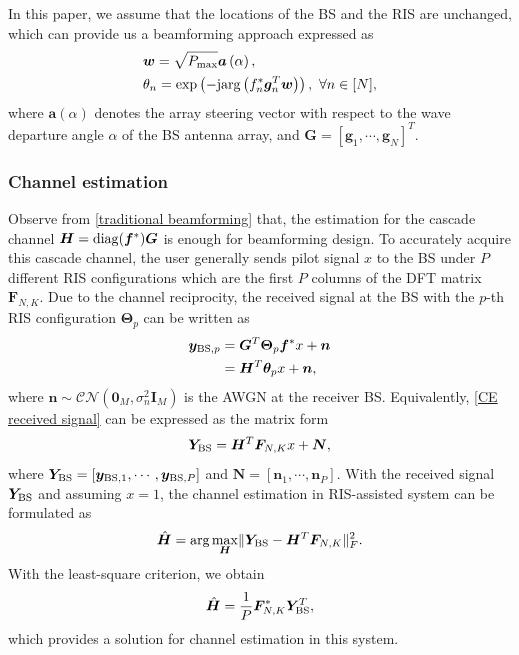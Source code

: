 \documentclass[12pt,draftclsnofoot,journal,onecolumn]{IEEEtran}
\theoremstyle{nonumberplain}
\def \exp {\text{exp}}
\def \arg {\text{arg}}
\begin{document}
        
        In this paper, we assume that the locations of the \ac{BS} and the RIS are unchanged, which can provide us a beamforming approach expressed as
                \begin{subequations}
\label{traditional beamforming}
\begin{align}
\label{w_optimal}
&\bm w=\sqrt{P_{\rm max}}\bm a\left(\alpha\right),\\
\label{theta_optimal}
&\theta_{n} = \exp\left(-{\rm j} \arg\left(f_{n}^{*}\bm g_{n}^{T}\bm w\right)\right),~\forall n\in [N],
\end{align}
\end{subequations}
where $\bm a(\alpha)$ denotes the array steering vector with respect to the wave departure angle $\alpha$ of the BS antenna array, and $\bm G = \left[\bm g_{1}, \cdots, \bm g_{N}\right]^{T}$.

\subsubsection{Channel estimation}
Observe from \eqref{traditional beamforming} that, the estimation for the cascade channel ${\bm H} = {\rm diag}({\bm f}^{*})\bm G$ is enough for beamforming design.
To accurately acquire this cascade channel, the user generally sends pilot signal $x$ to the BS under $P$ different RIS configurations which are the first $P$ columns of the DFT matrix $\bm F_{N,K}$. Due to the channel reciprocity, the received signal at the BS with the $p$-th RIS configuration $\bm \Theta_{p}$ can be written as \cite{atapattu2020reconfigurable}
    \begin{equation}
    \label{CE received signal}
    \begin{aligned}
            {\bm y}_{{\rm BS}, p} &={\bm G}^{T} {\bm \Theta}_p\bm f^{*} x+\bm n
            \\&=\bm H^{T} {\bm \theta}_p x+\bm n,
    \end{aligned}
    \end{equation}
    where $\bm n\sim \mathcal{CN}\left( \bm 0_{M}, \sigma_{n}^{2}\bm I_{M}\right)$ is the \ac{AWGN} at the receiver BS.
Equivalently, \eqref{CE received signal} can be expressed as the matrix form
    \begin{equation}
    \label{eqn:MMSE_CE}
        {\bm Y}_{\rm BS}=\bm H^{T} \bm F_{N,K}x + {\bm N},
    \end{equation}
    where ${\bm Y}_{\rm BS}=\left[\bm y_{{\rm BS}, 1},\cdots,\bm y_{{\rm BS}, P}\right]$ and $\bm N = \left[ \bm n_{1},\cdots,\bm n_{P}\right]$.
With the received signal $\bm Y_{\rm BS}$ and assuming $x=1$, the channel estimation in RIS-assisted system can be formulated as 
    \begin{equation}
        \hat{\bm H} = \arg\max_{\bm H} \lVert {\bm Y}_{\rm BS} - {\bm H^{T}} {\bm F}_{N,K}\rVert_{F}^2.
    \end{equation}
    With the least-square criterion, we obtain
    \begin{equation}
        \hat{\bm H} = \frac{1}{P}{\bm F}_{N,K}^{*}{\bm Y}_{\rm BS}^{T},
        \label{eqn:MMSE-CE}
    \end{equation}
    which provides a solution for channel estimation in this system.
\end{document}
